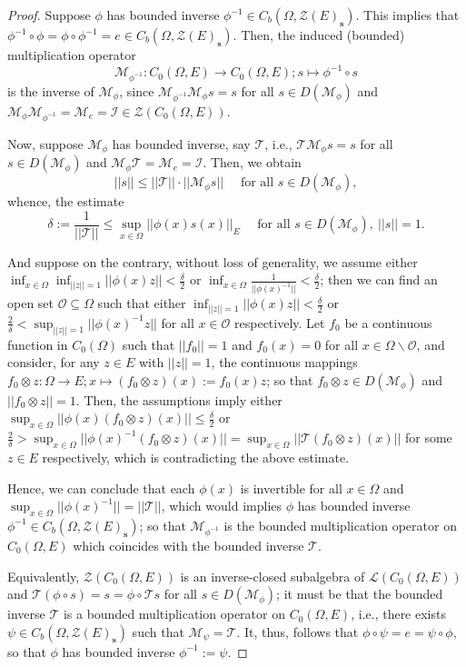 \documentclass{article}
\newcommand{\Bm}[1]{ \boldsymbol{ #1 }}
\newcommand{\mI}{\mathcal{I}}
\newcommand{\sL}{\mathscr{L}}
\newcommand{\mZ}{\mathcal{Z}}
\newcommand{\mO}{\mathcal{O}}
\newcommand{\mM}{\mathcal{M}}
\newcommand{\mT}{\mathcal{T}}
\newcommand{\cc}{\circ}
\newcommand{\q}{\quad}
\newcommand{\cd}{\cdot}
\newcommand{\lo}{\longrightarrow}
\newcommand{\sse}{\subseteq}
\newcommand{\bk}{\backslash}
\newcommand{\de}{\delta}
\newcommand{\Om}{\Omega}
\newcommand{\mt}{\mapsto}
\begin{document}
\begin{proof}
	

	\item[(iii)] Suppose $\phi$ has bounded inverse $\phi^{-1}\in C_b(\Om, \Bm{\mZ}(E)_\textbf{s})$. This implies that $\phi^{-1}\cc\phi =\phi\cc\phi^{-1} =e \in C_b(\Om, \Bm{\mZ}(E)_\textbf{s})$.  Then, the induced (bounded) multiplication operator $$\mM_{\phi^{-1}} : C_0(\Om, E) \lo C_0(\Om, E) ; s \mt \phi^{-1}\cc s$$ is the inverse of $\mM_\phi$, since  $\mM_{\phi^{-1}}\mM_\phi s = s$ for all $s\in D(\mM_\phi)$ and	
	$   \mM_\phi \mM_{\phi^{-1}} = \mM_e = \mI\in \Bm{\mZ} ( C_0(\Om, E))$. \bigskip
	
		
	Now, suppose $\mM_\phi$ has bounded inverse, say $\mT$, i.e., $\mT\mM_\phi s = s$ for all $s\in D(\mM_\phi)$ and $\mM_\phi\mT = \mM_e = \mI$. Then, we obtain
\[||s|| \le ||\mT|| \cd ||\mM_\phi s|| \q \text{ for all } s\in D(\mM_\phi),\]
	whence, the estimate
\[\de:= \frac{1}{||\mT||}\le \sup_{x\in\Om}||\phi(x)s(x)||_E \q \text{ for all } s\in D(\mM_\phi), \ ||s||=1.\]
	
	And suppose on the contrary, without loss of generality, we assume either $\inf_{x\in\Om}\inf_{||z||=1}||\phi(x)z||	<\frac{\de}{2}$ or $\inf_{x\in\Om} \frac{1}{||\phi(x)^{-1}||}<\frac{\de}{2}$; then we can find an open set $\mO \sse \Om$ such that either $\inf_{||z||=1}||\phi(x)z||<\frac{\de}{2}$ or $\frac{2}{\de}<\sup_{||z||=1}||\phi(x)^{-1}z||$ for all $x\in\mO$ respectively. Let $f_0$ be a continuous function in $C_0(\Om)$ such that $||f_0||=1$ and  $f_0(x)=0$ for all $x\in\Om\bk\mO$, and consider, for any $z\in E$ with $||z||=1$, the continuous mappings $f_0\otimes z : \Om \lo E ; x \mt (f_0\otimes z)(x):= f_0(x)z$; so that $f_0\otimes z \in D(\mM_\phi)$ and $||f_0\otimes z||=1$. Then, the assumptions imply either $\sup_{x\in\Om} ||\phi(x)(f_0\otimes z)(x)||\le\frac{\de}{2}$ or $\frac{2}{\de} >\sup_{x\in\Om}||\phi(x)^{-1}(f_0\otimes z)(x) ||   =\sup_{x\in\Om}||\mT(f_0\otimes z)(x)||  $ for some $z\in E$ respectively, which is contradicting the above estimate. 
	
	
	Hence, we can conclude that each $\phi(x)$ is invertible for all $x\in\Om$ and $\sup_{x\in\Om}||\phi(x)^{-1}||= ||\mT || $, which would implies $\phi$ has bounded inverse $\phi^{-1}\in C_b(\Om, \Bm{\mZ}(E)_\textbf{s})$; so that $\mM_{\phi^{-1}}$ is the bounded multiplication operator on  $C_0(\Om, E)$ which coincides with the bounded inverse $\mT$.	
	
	Equivalently, $\Bm{\mZ} ( C_0(\Om, E))$ is an inverse-closed subalgebra of  $\sL( C_0(\Om, E)) $ and $ \mT(\phi \cc s) = s = \phi \cc \mT s$ for all $s\in D(\mM_\phi)$; it must be that the bounded inverse $\mT$ is a bounded multiplication operator on  $C_0(\Om, E)$, i.e., there exists $\psi\in C_b(\Om, \Bm{\mZ}(E)_\textbf{s})$ such that $\mM_\psi = \mT$. 	It, thus, follows that $\phi \cc \psi = e=\psi \cc\phi $, so that $\phi$ has bounded inverse $\phi^{-1}:=\psi$.
	

\end{proof}
\end{document}
